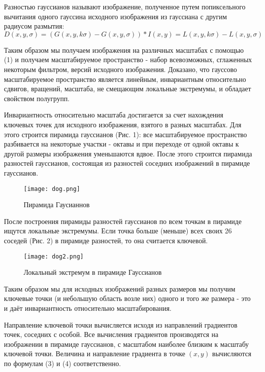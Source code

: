 Разностью гауссианов называют изображение, полученное путем попиксельного вычитания одного гауссина исходного изображения из гауссиана с другим радиусом размытия:
\begin{equation}
    D(x,y,\sigma) = (G(x,y,k\sigma)-G(x,y,\sigma)) * I(x,y) = L(x,y,k\sigma) - L(x,y,\sigma)
\end{equation}

Таким образом мы получаем изображения на различных масштабах с помощью (1) и получаем масштабируемое пространство - набор всевозможных, сглаженных некоторым фильтром, версий исходного изображения. Доказано, что гауссово масштабируемое пространство является линейным, инвариантным относительно сдвигов, вращений, масштаба, не смещающим локальные экстремумы, и обладает свойством полугрупп.

Инвариантность относительно масштаба достигается за счет нахождения ключевых точек для исходного изображения, взятого в разных масштабах. Для этого строится пирамида гауссианов (Рис. 1): все масштабируемое пространство разбивается на некоторые участки - октавы и при переходе от одной октавы к другой размеры изображения уменьшаются вдвое. После этого строится пирамида разностей гауссианов, состоящая из разностей соседних изображений в пирамиде гауссианов.

\begin{figure}[h]
    \centering
    \texttt{[image: dog.png]}
    \caption{Пирамида Гаусианнов}
    \label{fig:dog1}
\end{figure}

После построения пирамиды разностей гауссианов по всем точкам в пирамиде ищутся локальные экстремумы. Если точка больше (меньше) всех своих 26 соседей (Рис. 2) в пирамиде разностей, то она считается ключевой.

\begin{figure}[h]
    \centering
    \texttt{[image: dog2.png]}
    \caption{Локальный экстремум в пирамиде Гауссианов}
    \label{fig:dog2}
\end{figure}

Таким образом мы для исходных изображений разных размеров мы получим ключевые точки (и небольшую область возле них) одного и того же размера - это и даёт инвариантность относительно масштабирования.

Направление ключевой точки вычисляется исходя из направлений градиентов точек, соседних с особой. Все вычисления градиентов производятся на изображении в пирамиде гауссианов, с масштабом наиболее близким к масштабу ключевой точки. Величина и направление градиента в точке $(x,y)$ вычисляются по формулам (3) и (4) соответственно.

